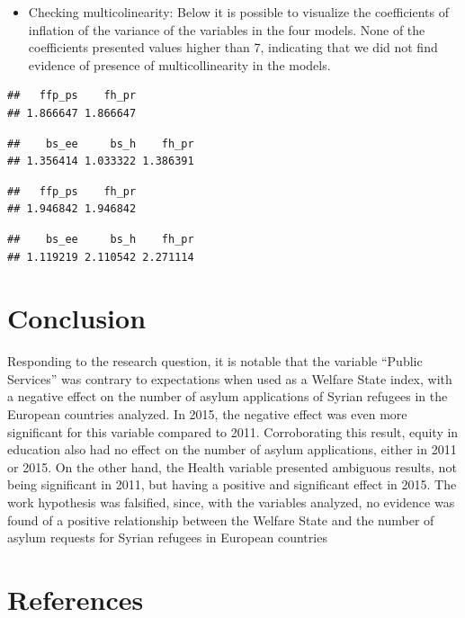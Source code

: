 \documentclass[]{elsarticle} %
\providecommand{\tightlist}{%
  \setlength{\itemsep}{0pt}\setlength{\parskip}{0pt}}
\begin{document}
\begin{itemize}
\tightlist
\item
  Checking multicolinearity: Below it is possible to visualize the
  coefficients of inflation of the variance of the variables in the four
  models. None of the coefficients presented values higher than 7,
  indicating that we did not find evidence of presence of
  multicollinearity in the models.
\end{itemize}

\begin{verbatim}
##   ffp_ps    fh_pr 
## 1.866647 1.866647
\end{verbatim}

\begin{verbatim}
##    bs_ee     bs_h    fh_pr 
## 1.356414 1.033322 1.386391
\end{verbatim}

\begin{verbatim}
##   ffp_ps    fh_pr 
## 1.946842 1.946842
\end{verbatim}

\begin{verbatim}
##    bs_ee     bs_h    fh_pr 
## 1.119219 2.110542 2.271114
\end{verbatim}

\section{Conclusion}\label{conclusion}

Responding to the research question, it is notable that the variable
``Public Services'' was contrary to expectations when used as a Welfare
State index, with a negative effect on the number of asylum applications
of Syrian refugees in the European countries analyzed. In 2015, the
negative effect was even more significant for this variable compared to
2011. Corroborating this result, equity in education also had no effect
on the number of asylum applications, either in 2011 or 2015. On the
other hand, the Health variable presented ambiguous results, not being
significant in 2011, but having a positive and significant effect in
2015. The work hypothesis was falsified, since, with the variables
analyzed, no evidence was found of a positive relationship between the
Welfare State and the number of asylum requests for Syrian refugees in
European countries

\section*{References}\label{references}
\end{document}
